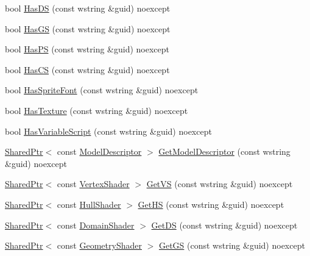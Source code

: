 \begin{DoxyCompactItemize}
\item 
bool \hyperlink{classmage_1_1_resource_manager_a9056d3cccb543acfbc48554adb80413e}{Has\+DS} (const wstring \&guid) noexcept
\item 
bool \hyperlink{classmage_1_1_resource_manager_aa93e710727fb3b6351317a7eddec376c}{Has\+GS} (const wstring \&guid) noexcept
\item 
bool \hyperlink{classmage_1_1_resource_manager_aa8bb9d0a4217bd02566583402a3241f8}{Has\+PS} (const wstring \&guid) noexcept
\item 
bool \hyperlink{classmage_1_1_resource_manager_a697c9c96fbf9d4f0382e769d4872aabb}{Has\+CS} (const wstring \&guid) noexcept
\item 
bool \hyperlink{classmage_1_1_resource_manager_a505a5b25923d88020d85a2f3307e4b7f}{Has\+Sprite\+Font} (const wstring \&guid) noexcept
\item 
bool \hyperlink{classmage_1_1_resource_manager_a617768fb9ec0c7c8f00b3f34c6386dfa}{Has\+Texture} (const wstring \&guid) noexcept
\item 
bool \hyperlink{classmage_1_1_resource_manager_a34d72d4729102af23d73438eea629e02}{Has\+Variable\+Script} (const wstring \&guid) noexcept
\item 
\hyperlink{namespacemage_a1e01ae66713838a7a67d30e44c67703e}{Shared\+Ptr}$<$ const \hyperlink{classmage_1_1_model_descriptor}{Model\+Descriptor} $>$ \hyperlink{classmage_1_1_resource_manager_a311d328f5a7cbb82da84815ee195c06f}{Get\+Model\+Descriptor} (const wstring \&guid) noexcept
\item 
\hyperlink{namespacemage_a1e01ae66713838a7a67d30e44c67703e}{Shared\+Ptr}$<$ const \hyperlink{classmage_1_1_vertex_shader}{Vertex\+Shader} $>$ \hyperlink{classmage_1_1_resource_manager_a76e1c55d7c2e7b95b2ef92ebc8fcf200}{Get\+VS} (const wstring \&guid) noexcept
\item 
\hyperlink{namespacemage_a1e01ae66713838a7a67d30e44c67703e}{Shared\+Ptr}$<$ const \hyperlink{namespacemage_a964e5e384b0e55ac900c819da48b6000}{Hull\+Shader} $>$ \hyperlink{classmage_1_1_resource_manager_a6b36abca958e92f7a3787598d9c13352}{Get\+HS} (const wstring \&guid) noexcept
\item 
\hyperlink{namespacemage_a1e01ae66713838a7a67d30e44c67703e}{Shared\+Ptr}$<$ const \hyperlink{namespacemage_aef8cda73e2387cb89baa6c54a7fea542}{Domain\+Shader} $>$ \hyperlink{classmage_1_1_resource_manager_a8456ada6f4938fb1c8220cfe988ad8a7}{Get\+DS} (const wstring \&guid) noexcept
\item 
\hyperlink{namespacemage_a1e01ae66713838a7a67d30e44c67703e}{Shared\+Ptr}$<$ const \hyperlink{namespacemage_a0cf0bb4b74903e78658c96412d5687a6}{Geometry\+Shader} $>$ \hyperlink{classmage_1_1_resource_manager_a66d1b171420e1a3310c6db5db88e3029}{Get\+GS} (const wstring \&guid) noexcept

\end{DoxyCompactItemize}
